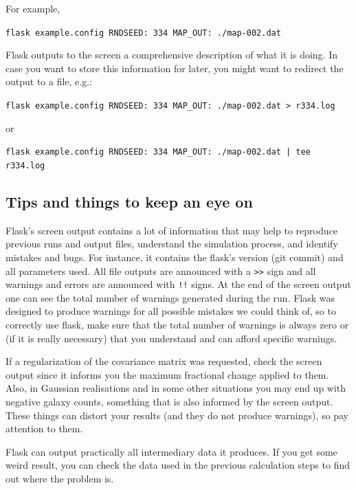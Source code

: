 \documentclass[12pt]{book} %
\begin{document}
\noindent
For example,

\vspace{0.5cm}
\noindent
{\tt flask example.config RNDSEED: 334 MAP\_OUT: ./map-002.dat}
\vspace{0.5cm}

{\sc Flask} outputs to the screen a comprehensive description of what it is doing. In case you want to 
store this information for later, you might want to redirect the output to a file, e.g.: 

\vspace{0.5cm}
\noindent
{\tt flask example.config RNDSEED: 334 MAP\_OUT: ./map-002.dat > r334.log}

\noindent
or

\noindent
{\tt flask example.config RNDSEED: 334 MAP\_OUT: ./map-002.dat | tee r334.log}
\vspace{0.5cm}


\subsection{Tips and things to keep an eye on}
\label{sec:tips}

{\sc Flask}'s screen output contains a lot of information that may help 
to reproduce previous runs and output files, understand the simulation process, 
and identify mistakes and bugs. For instance, it contains the {\sc flask}'s version 
(git commit) and all parameters used. All file outputs are announced with a {\tt >>} sign 
and all warnings and errors are announced with {\tt !!} signs. At the end of the 
screen output one can see the total number of warnings generated during the run. 
{\sc Flask} was designed to produce warnings for all possible mistakes we could think of, so 
to correctly use {\sc flask}, make sure that the total number of warnings is always zero 
or (if it is really necessary) that you understand and can afford specific warnings.

If a regularization of the covariance matrix was requested, check the screen output 
since it informs you the maximum fractional change applied to them. Also, in Gaussian 
realisations and in some other situations you may end up with negative galaxy counts, 
something that is also informed by the screen output. These things can distort your 
results (and they do not produce warnings), so pay attention to them. 

{\sc Flask} can output practically all intermediary data it produces. If you get some 
weird result, you can check the data used in the previous calculation steps to 
find out where the problem is. 
   
\end{document}
